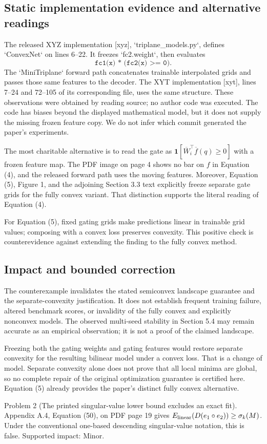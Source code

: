 \documentclass[10pt]{article}
\begin{document}
\subsection*{Static implementation evidence and alternative readings}
The released XYZ implementation [xyz], `triplane\_models.py`, defines `ConvexNet` on lines 6–22. It freezes `fc2.weight`, then evaluates \[\texttt{fc1(x) * (fc2(x) >= 0)}.\] The `MiniTriplane` forward path concatenates trainable interpolated grids and passes those same features to the decoder. The XYT implementation [xyt], lines 7–24 and 72–105 of its corresponding file, uses the same structure. These observations were obtained by reading source; no author code was executed. The code has biases beyond the displayed mathematical model, but it does not supply the missing frozen feature copy. We do not infer which commit generated the paper’s experiments.\par
The most charitable alternative is to read the gate as \(\mathbf{1}[\overline W_i^\top\overline f(q)\geq0]\) with a frozen feature map. The PDF image on page 4 shows no bar on \(f\) in Equation (4), and the released forward path uses the moving features. Moreover, Equation (5), Figure 1, and the adjoining Section 3.3 text explicitly freeze separate gate grids for the fully convex variant. That distinction supports the literal reading of Equation (4).\par
For Equation (5), fixed gating grids make predictions linear in trainable grid values; composing with a convex loss preserves convexity. This positive check is counterevidence against extending the finding to the fully convex method.\par
\subsection*{Impact and bounded correction}
The counterexample invalidates the stated semiconvex landscape guarantee and the separate-convexity justification. It does not establish frequent training failure, altered benchmark scores, or invalidity of the fully convex and explicitly nonconvex models. The observed multi-seed stability in Section 5.4 may remain accurate as an empirical observation; it is not a proof of the claimed landscape.\par
Freezing both the gating weights and gating features would restore separate convexity for the resulting bilinear model under a convex loss. That is a change of model. Separate convexity alone does not prove that all local minima are global, so no complete repair of the original optimization guarantee is certified here. Equation (5) already provides the paper’s distinct fully convex alternative.\par
Problem 2 (The printed singular-value lower bound excludes an exact fit).  Appendix A.4, Equation (50), on PDF page 19 gives \(E_{\rm linear}(D(e_1\circ e_2))\geq \sigma_k(M)\). Under the conventional one-based descending singular-value notation, this is false. Supported impact: Minor.\par
\end{document}
